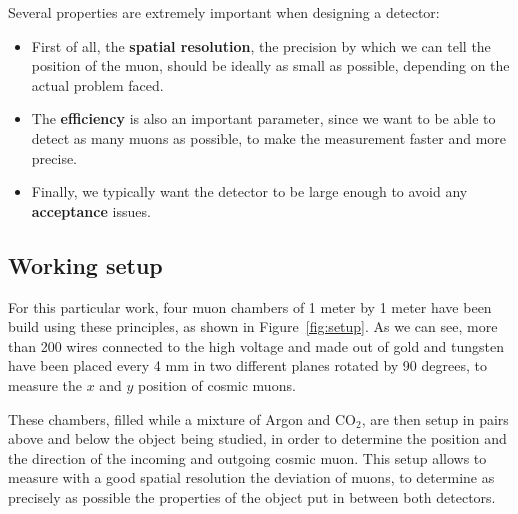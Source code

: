 \documentclass[a4paper, 11pt]{report}
\begin{document}
Several properties are extremely important when designing a detector:
\begin{itemize}
\item First of all, the \textbf{spatial resolution}, the precision by which we can tell the position of the muon, should be ideally as small as possible, depending on the actual problem faced.
\item The \textbf{efficiency} is also an important parameter, since we want to be able to detect as many muons as possible, to make the measurement faster and more precise.
\item Finally, we typically want the detector to be large enough to avoid any \textbf{acceptance} issues.
\end{itemize}

\subsection{Working setup} \label{sec:ourSetup}

For this particular work, four muon chambers of 1 meter by 1 meter have been build using these principles, as shown in Figure~\ref{fig:setup}. As we can see, more than 200 wires connected to the high voltage and made out of gold and tungsten have been placed every 4 mm in two different planes rotated by 90 degrees, to measure the $x$ and $y$ position of cosmic muons. 

These chambers, filled while a mixture of Argon and CO$_2$, are then setup in pairs above and below the object being studied, in order to determine the position and the direction of the incoming and outgoing cosmic muon. This setup allows to measure with a good spatial resolution the deviation of muons, to determine as precisely as possible the properties of the object put in between both detectors.
\end{document}
